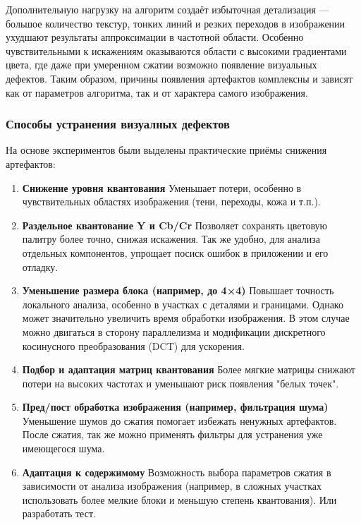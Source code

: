  Дополнительную нагрузку на алгоритм создаёт избыточная детализация — большое количество текстур, 
 тонких линий и резких переходов в изображении ухудшают результаты аппроксимации в частотной области. 
 Особенно чувствительными к искажениям оказываются области с высокими градиентами цвета, 
 где даже при умеренном сжатии возможно появление визуальных дефектов. 
 Таким образом, причины появления артефактов комплексны и зависят как от параметров алгоритма, 
 так и от характера самого изображения.


\subsubsection{Способы устранения визуалных дефектов}

На основе экспериментов были выделены практические приёмы снижения артефактов:

\begin{enumerate}
    \item \textbf{Снижение уровня квантования}
    Уменьшает потери, особенно в чувствительных областях изображения (тени, переходы, кожа и т.п.).

    \item \textbf{Раздельное квантование Y и Cb/Cr}
    Позволяет сохранять цветовую палитру более точно, снижая искажения. Так же удобно, для анализа отдельных
    компонентов, упрощает посиск ошибок в приложении и его отладку.

    \item \textbf{Уменьшение размера блока (например, до 4×4)}
    Повышает точность локального анализа, особенно в участках с деталями и границами.
    Однако может значительно увеличить время обработки изображения. В этом случае можно двигаться в сторону 
    параллелизма и модификации дискретного косинусного преобразования (DCT) для ускорения.

    \item \textbf{Подбор и адаптация матриц квантования}
    Более мягкие матрицы снижают потери на высоких частотах и уменьшают риск появления "белых точек".

    \item \textbf{Пред/пост обработка изображения (например, фильтрация шума)}
    Уменьшение шумов до сжатия помогает избежать ненужных артефактов. После сжатия, так же можно применять
    фильтры для устранения уже имеющегося шума.

    \item \textbf{Адаптация к содержимому}
    Возможность выбора параметров сжатия в зависимости от анализа изображения 
    (например, в сложных участках использовать более мелкие блоки и меньшую степень квантования).
    Или разработать тест.
\end{enumerate}


